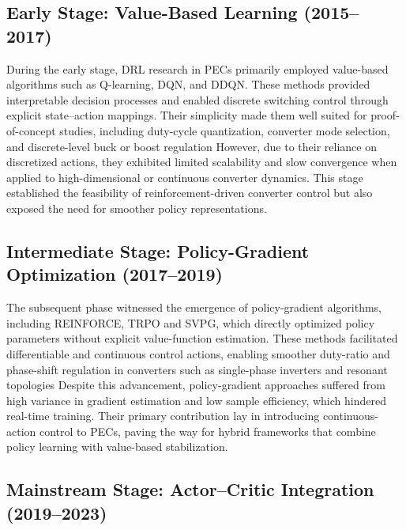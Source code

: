 \subsection{Early Stage: Value-Based Learning (2015--2017)}

During the early stage, DRL research in PECs primarily employed value-based algorithms such as Q-learning, DQN, and DDQN. 
These methods provided interpretable decision processes and enabled discrete switching control through explicit state--action mappings. 
Their simplicity made them well suited for proof-of-concept studies, including duty-cycle quantization, converter mode selection, and discrete-level buck or boost regulation
However, due to their reliance on discretized actions, they exhibited limited scalability and slow convergence when applied to high-dimensional or continuous converter dynamics. 
This stage established the feasibility of reinforcement-driven converter control but also exposed the need for smoother policy representations.

\subsection{Intermediate Stage: Policy-Gradient Optimization (2017--2019)}

The subsequent phase witnessed the emergence of policy-gradient algorithms, including REINFORCE, TRPO and SVPG, which directly optimized policy parameters without explicit value-function estimation.  
These methods facilitated differentiable and continuous control actions, enabling smoother duty-ratio and phase-shift regulation in converters such as single-phase inverters and resonant topologies
Despite this advancement, policy-gradient approaches suffered from high variance in gradient estimation and low sample efficiency, which hindered real-time training.  
Their primary contribution lay in introducing continuous-action control to PECs, paving the way for hybrid frameworks that combine policy learning with value-based stabilization.

\subsection{Mainstream Stage: Actor--Critic Integration (2019--2023)}

